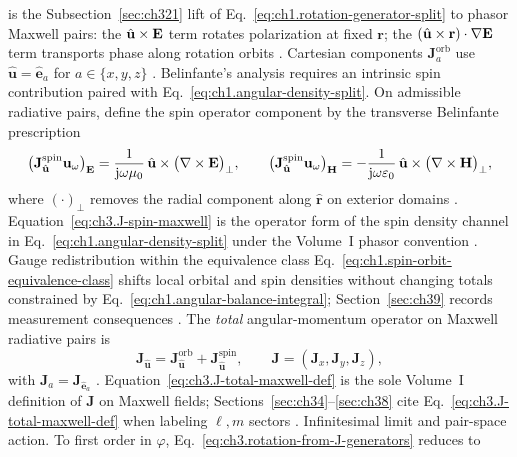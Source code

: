 is the Subsection~\ref{sec:ch321} lift of Eq.~\eqref{eq:ch1.rotation-generator-split} to phasor Maxwell pairs:
the \(\hat{\mathbf{u}}\times\mathbf{E}\) term rotates polarization at fixed \(\mathbf{r}\); the
\((\hat{\mathbf{u}}\times\mathbf{r})\cdot\nabla\mathbf{E}\) term transports phase along rotation orbits
\cite{jackson1999}. Cartesian components \(\mathbf{J}_{a}^{\mathrm{orb}}\) use
\(\hat{\mathbf{u}}=\hat{\mathbf{e}}_a\) for \(a\in\{x,y,z\}\) \cite{jackson1999}.
Belinfante's analysis \cite{belinfante1940} requires an intrinsic spin contribution paired with
Eq.~\eqref{eq:ch1.angular-density-split}. On admissible radiative pairs, define the spin operator component by
the transverse Belinfante prescription
\begin{equation}
\label{eq:ch3.J-spin-maxwell}
\big(\mathbf{J}_{\hat{\mathbf{u}}}^{\mathrm{spin}}\mathbf{u}_\omega\big)_{\mathbf{E}}
=
\frac{1}{\mathrm{j}\omega\mu_0}\,
\hat{\mathbf{u}}\times\big(\nabla\times\mathbf{E}\big)_{\perp},
\qquad
\big(\mathbf{J}_{\hat{\mathbf{u}}}^{\mathrm{spin}}\mathbf{u}_\omega\big)_{\mathbf{H}}
=
-\frac{1}{\mathrm{j}\omega\varepsilon_0}\,
\hat{\mathbf{u}}\times\big(\nabla\times\mathbf{H}\big)_{\perp},
\end{equation}
where \((\cdot)_{\perp}\) removes the radial component along \(\hat{\mathbf{r}}\) on exterior domains
\cite{belinfante1940}. Equation~\eqref{eq:ch3.J-spin-maxwell} is the operator form of
the spin density channel in Eq.~\eqref{eq:ch1.angular-density-split} under the Volume~I phasor convention
\cite{belinfante1940}. Gauge redistribution within the equivalence class
Eq.~\eqref{eq:ch1.spin-orbit-equivalence-class} shifts local orbital and spin densities without changing
totals constrained by Eq.~\eqref{eq:ch1.angular-balance-integral}; Section~\ref{sec:ch39} records measurement
consequences \cite{belinfante1940}.
The \emph{total} angular-momentum operator on Maxwell radiative pairs is
\begin{equation}
\label{eq:ch3.J-total-maxwell-def}
\mathbf{J}_{\hat{\mathbf{u}}}
=
\mathbf{J}_{\hat{\mathbf{u}}}^{\mathrm{orb}}
+
\mathbf{J}_{\hat{\mathbf{u}}}^{\mathrm{spin}},
\qquad
\mathbf{J}
=
(\mathbf{J}_{x},\mathbf{J}_{y},\mathbf{J}_{z}),
\end{equation}
with \(\mathbf{J}_{a}=\mathbf{J}_{\hat{\mathbf{e}}_a}\) \cite{jackson1999}.
Equation~\eqref{eq:ch3.J-total-maxwell-def} is the sole Volume~I definition of \(\mathbf{J}\) on Maxwell
fields; Sections~\ref{sec:ch34}--\ref{sec:ch38} cite Eq.~\eqref{eq:ch3.J-total-maxwell-def} when labeling
\(\ell,m\) sectors \cite{hansen1988}.
Infinitesimal limit and pair-space action. To first order in \(\varphi\), Eq.~\eqref{eq:ch3.rotation-from-J-generators} reduces to

